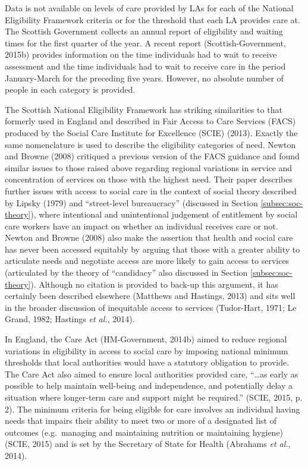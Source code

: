 \documentclass[12pt,a4paper,oneside,table]{report}
\begin{document}
Data is not available on levels of care provided by LAs for each of the
National Eligibility Framework criteria or for the threshold that each
LA provides care at. The Scottish Government collects an annual report
of eligibility and waiting times for the first quarter of the year. A
recent report (Scottish-Government, 2015b) provides information on the
time individuals had to wait to receive assessment and the time
individuals had to wait to receive care in the period January-March for
the preceding five years. However, no absolute number of people in each
category is provided.

The Scottish National Eligibility Framework has striking similarities to
that formerly used in England and described in Fair Access to Care
Services (FACS) produced by the Social Care Institute for Excellence
(SCIE) (2013). Exactly the same nomenclature is used to describe the
eligibility categories of need. Newton and Browne (2008) critiqued a
previous version of the FACS guidance and found similar issues to those
raised above regarding regional variations in service and concentration
of services on those with the highest need. Their paper describes
further issues with access to social care in the context of social
theory described by Lipsky (1979) and ``street-level bureaucracy''
(discussed in Section \ref{subsec:soc-theory}), where intentional and
unintentional judgement of entitlement by social care workers have an
impact on whether an individual receives care or not. Newton and Browne
(2008) also make the assertion that health and social care has never
been accessed equitably by arguing that those with a greater ability to
articulate needs and negotiate access are more likely to gain access to
services (articulated by the theory of ``candidacy'' also discussed in
Section \ref{subsec:soc-theory}). Although no citation is provided to
back-up this argument, it has certainly been described elsewhere
(Matthews and Hastings, 2013) and sits well in the broader discussion of
inequitable access to services (Tudor-Hart, 1971; Le Grand, 1982;
Hastings \emph{et al.}, 2014).

In England, the Care Act (HM-Government, 2014b) aimed to reduce regional
variations in eligibility in access to social care by imposing national
minimum thresholds that local authorities would have a statutory
obligation to provide. The Care Act also aimed to ensure local
authorities provided care, ``\ldots{}as early as possible to help
maintain well-being and independence, and potentially delay a situation
where longer-term care and support might be required.'' (SCIE, 2015, p.
2). The minimum criteria for being eligible for care involves an
individual having needs that impairs their ability to meet two or more
of a designated list of outcomes (e.g.~managing and maintaining
nutrition or maintaining hygiene) (SCIE, 2015) and is set by the
Secretary of State for Health (Abrahams \emph{et al.}, 2014).
\end{document}
